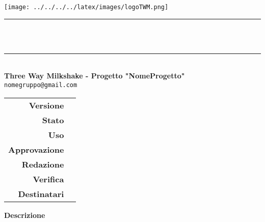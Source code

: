 \thispagestyle{empty}
\begin{titlepage}
	\begin{center}
		
		\texttt{[image: ../../../../latex/images/logoTWM.png]}\\[0.7cm]
		

		\noindent\rule{\textwidth}{1pt} \\[0.4cm]
		\Huge \textbf{\doctitle} \\[0.1cm]
		\ifthenelse{\equal{\docdate}{ }}{ }{ \huge \textbf{\docdate} \\[0.1cm] }
		
		\noindent\rule{\textwidth}{1pt}\\[0.7cm]
		
		\large \textbf{Three Way Milkshake - Progetto "NomeProgetto"} \\[0.4cm] 
                \texttt{nomegruppo@gmail.com} \\[0.4cm]
                
		
        
        \vfill
        \large

        \begin{tabular}{r|l}
                        \textbf{Versione} & \rev{} \\
                        \textbf{Stato} & \stato{} \\
                        \textbf{Uso} & \uso{} \\                         
                        \textbf{Approvazione} & \approv{} \\
                        \textbf{Redazione} & \red{} \\ 
                        \textbf{Verifica} & \ver{} \\                          
                        \textbf{Destinatari} & \parbox[t]{5cm}{ \dest{} }
                \end{tabular}
                \vfill
                \large \textbf{Descrizione} \\ \describedoc{} \\
               

	\end{center}
\end{titlepage}